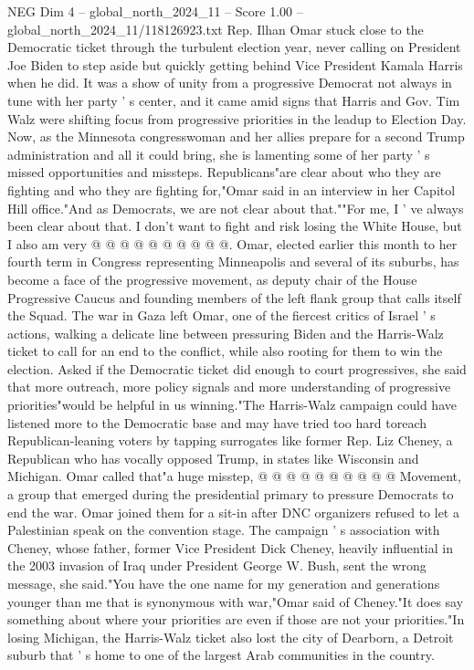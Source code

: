 \begin{textsample}{NEG Dim 4 – global\_north\_2024\_11 – Score 1.00 – global\_north\_2024\_11/118126923.txt}  \label{ex:f4_neg_163}
Rep.
Ilhan Omar stuck close to the Democratic ticket through the turbulent election year, never calling on President Joe Biden to step aside but quickly getting behind Vice President Kamala Harris when he did.
It was a show of unity from a progressive Democrat not always in tune with her party ' s center, and it came amid signs that Harris and Gov.
Tim Walz were shifting focus from progressive priorities in the leadup to Election Day.
Now, as the Minnesota congresswoman and her allies prepare for a second Trump administration and all it could bring, she is lamenting some of her party ' s missed opportunities and missteps.
Republicans"are clear about who they are fighting and who they are fighting for,"Omar said in an interview in her Capitol Hill office."And as Democrats, we are not clear about that.""For me, I ' ve always been clear about that.
I don't want to fight and risk losing the White House, but I also am very @ @ @ @ @ @ @ @ @ @.
Omar, elected earlier this month to her fourth term in Congress representing Minneapolis and several of its suburbs, has become a face of the progressive movement, as deputy chair of the House Progressive Caucus and founding members of the left flank group that calls itself the Squad.
The war in Gaza left Omar, one of the fiercest critics of Israel ' s actions, walking a delicate line between pressuring Biden and the Harris-Walz ticket to call for an end to the conflict, while also rooting for them to win the election.
Asked if the Democratic ticket did enough to court progressives, she said that more outreach, more policy signals and more understanding of progressive priorities"would be helpful in us winning."The Harris-Walz campaign could have listened more to the Democratic base and may have tried too hard toreach Republican-leaning voters by tapping surrogates like former Rep.
Liz Cheney, a Republican who has vocally opposed Trump, in states like Wisconsin and Michigan.
Omar called that"a huge misstep, @ @ @ @ @ @ @ @ @ @ Movement, a group that emerged during the presidential primary to pressure Democrats to end the war.
Omar joined them for a sit-in after DNC organizers refused to let a Palestinian speak on the convention stage.
The campaign ' s association with Cheney, whose father, former Vice President Dick Cheney, heavily influential in the 2003 invasion of Iraq under President George W.
Bush, sent the wrong message, she said."You have the one name for my generation and generations younger than me that is synonymous with war,"Omar said of Cheney."It does say something about where your priorities are even if those are not your priorities."In losing Michigan, the Harris-Walz ticket also lost the city of Dearborn, a Detroit suburb that ' s home to one of the largest Arab communities in the country.

\end{textsample}
